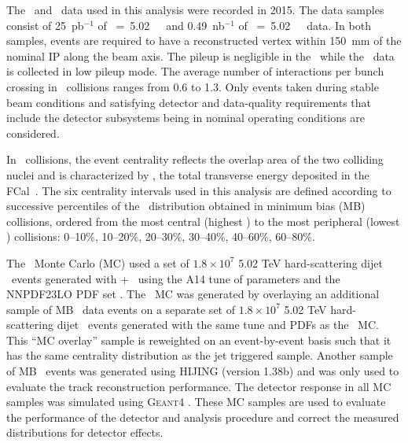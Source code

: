 
The \PbPb\ and \pp\ data used in this analysis were recorded in 2015.
The data samples consist of 25~pb$^{-1}$ of \sqrts~=~5.02~\TeV\ \pp\ and 0.49~nb$^{-1}$ of \sqrtsnn~=~5.02~\TeV\ \pbpb\ data.
In both samples, events are required to have a reconstructed vertex within 150~mm of the nominal IP along the beam axis.
The pileup is negligible in the \pbpb\ while the \pp\ data is collected in low pileup mode.
The average number of interactions per bunch crossing in \pp\ collisions ranges from 0.6 to 1.3.
Only events taken during stable beam conditions and satisfying detector and data-quality requirements that include the detector subsystems being in nominal operating conditions are considered.

In \pbpb\ collisions, the event centrality reflects the overlap area of the two colliding nuclei and is characterized by \ETfcal, the total transverse energy deposited in the FCal~\cite{Aaboud:2017tql}.
The six centrality intervals used in this analysis are defined according to successive percentiles of the \ETfcal\ distribution obtained in minimum bias (MB) collisions, ordered from the most central (highest \ETfcal) to the most peripheral (lowest \ETfcal) collisions: 0--10\%, 10--20\%, 20--30\%, 30--40\%, 40--60\%, 60--80\%.

The \pp\ Monte Carlo (MC) used a set of $1.8\times10^7$ 5.02 TeV hard-scattering dijet \pp\ events generated with \powheg{}+\pythiaeight\ \cite{Nason:2004rx,Sjostrand:2014zea} using the A14 tune of parameters \cite{ATLAS2014021} and the NNPDF23LO PDF set \cite{Ball:2012cx}.
The \pbpb\ MC was generated by overlaying an additional sample of MB \pbpb\ data events on a separate set of $1.8\times10^7$ 5.02 TeV hard-scattering dijet \pp\ events generated with the same tune and PDFs as the \pp\ MC.
This ``MC overlay'' sample is reweighted on an event-by-event basis such that it has the same centrality distribution as the jet triggered sample.
Another sample of MB \pbpb\ events was generated using HIJING (version 1.38b) \cite{Wang:1991hta} and was only used to evaluate the track reconstruction performance.
The detector response in all MC samples was simulated using \textsc{Geant4} \cite{Agostinelli:2002hh,Aad:2010ah}.
These MC samples are used to evaluate the performance of the detector and analysis procedure and correct the measured distributions for detector effects.



